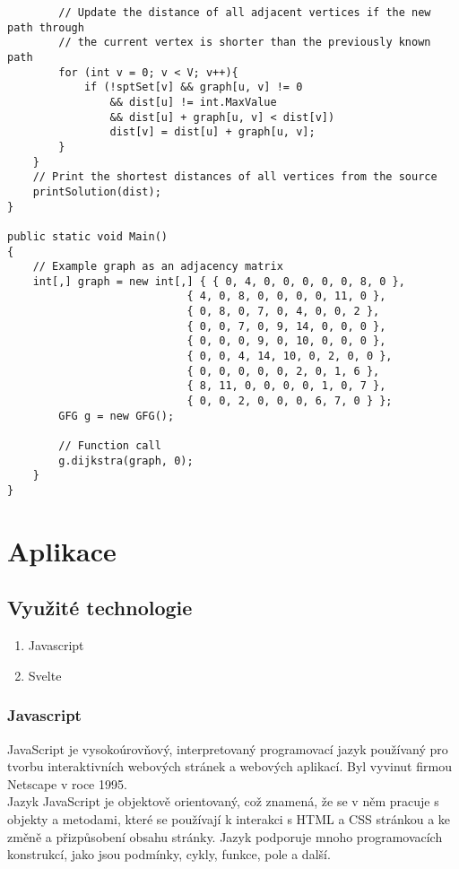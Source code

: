 \documentclass[12pt, titlepage, a4paper]{article}
\begin{document}
\begin{lstlisting}
        // Update the distance of all adjacent vertices if the new path through
        // the current vertex is shorter than the previously known path
        for (int v = 0; v < V; v++){
            if (!sptSet[v] && graph[u, v] != 0
                && dist[u] != int.MaxValue
                && dist[u] + graph[u, v] < dist[v])
                dist[v] = dist[u] + graph[u, v];
        }
    }
    // Print the shortest distances of all vertices from the source
    printSolution(dist);
}

public static void Main()
{
    // Example graph as an adjacency matrix
    int[,] graph = new int[,] { { 0, 4, 0, 0, 0, 0, 0, 8, 0 },
                            { 4, 0, 8, 0, 0, 0, 0, 11, 0 },
                            { 0, 8, 0, 7, 0, 4, 0, 0, 2 },
                            { 0, 0, 7, 0, 9, 14, 0, 0, 0 },
                            { 0, 0, 0, 9, 0, 10, 0, 0, 0 },
                            { 0, 0, 4, 14, 10, 0, 2, 0, 0 },
                            { 0, 0, 0, 0, 0, 2, 0, 1, 6 },
                            { 8, 11, 0, 0, 0, 0, 1, 0, 7 },
                            { 0, 0, 2, 0, 0, 0, 6, 7, 0 } };
        GFG g = new GFG();
 
        // Function call
        g.dijkstra(graph, 0);
    }
}
\end{lstlisting}
\clearpage
\section{Aplikace}
\subsection{Využité technologie}
\begin{enumerate}
    \item Javascript
    \item Svelte
\end{enumerate}
\subsubsection{Javascript}
JavaScript je vysokoúrovňový, interpretovaný programovací jazyk používaný pro tvorbu interaktivních 
webových stránek a webových aplikací. Byl vyvinut firmou Netscape v roce 1995.
\\

Jazyk JavaScript je objektově orientovaný, což znamená, že se v něm pracuje s objekty a metodami, 
které se používají k interakci s HTML a CSS stránkou a ke změně a přizpůsobení obsahu stránky. 
Jazyk podporuje mnoho programovacích konstrukcí, jako jsou podmínky, cykly, funkce, pole a další.
\\
\end{document}
